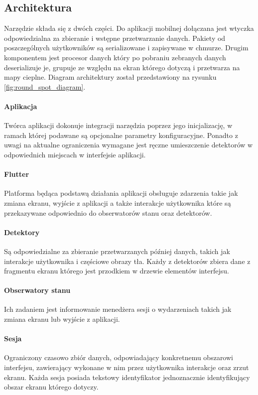 \subsection{Architektura}
Narzędzie składa się z dwóch części. Do aplikacji mobilnej dołączana jest wtyczka odpowiedzialna za zbieranie i wstępne przetwarzanie danych. Pakiety od poszczególnych użytkowników są serializowane i zapisywane w chmurze. Drugim komponentem jest procesor danych który po pobraniu zebranych danych deserializuje je, grupuje ze względu na ekran którego dotyczą i przetwarza na mapy cieplne. Diagram architektury został przedstawiony na rysunku \ref{fig:round_spot_diagram}.
\bigskip
{}

\paragraph{Aplikacja}
Twórca aplikacji dokonuje integracji narzędzia poprzez jego inicjalizację, w ramach której podawane są  opcjonalne parametry konfiguracyjne. Ponadto z uwagi na aktualne ograniczenia wymagane jest ręczne umieszczenie detektorów w odpowiednich miejscach w interfejsie aplikacji.

\paragraph{Flutter} Platforma będąca podstawą działania aplikacji obsługuje zdarzenia takie jak zmiana ekranu, wyjście z aplikacji a także interakcje użytkownika które są przekazywane odpowiednio do obserwatorów stanu oraz detektorów.

\paragraph{Detektory} 
\label{par:rs_detectors}
Są odpowiedzialne za zbieranie przetwarzanych później danych, takich jak interakcje użytkownika i częściowe obrazy tła. Każdy z detektorów zbiera dane z fragmentu ekranu którego jest przodkiem w drzewie elementów interfejsu.

\paragraph{Obserwatory stanu} 
\label{par:rs_observers}
Ich zadaniem jest informowanie menedżera sesji o wydarzeniach takich jak zmiana ekranu lub wyjście z aplikacji.

\paragraph{Sesja}
\label{par:rs_session}
Ograniczony czasowo zbiór danych, odpowiadający konkretnemu obszarowi interfejsu, zawierający wykonane w nim przez użytkownika interakcje oraz zrzut ekranu. Każda sesja posiada tekstowy identyfikator jednoznacznie identyfikujący obszar ekranu którego dotyczy.


